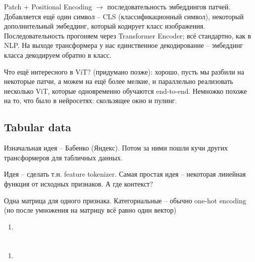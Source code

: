 \documentclass[a4paper,12pt]{article}
\begin{document}
Patch + Positional Encoding $ \to $ последовательность эмбеддингов патчей.
Добавляется ещё один символ -- CLS (классификационный символ), некоторый дополнительный эмбеддинг, который кодирует класс изображения.
Последовательность прогоняем через Transformer Encoder; всё стандартно, как в NLP.
На выходе трансформера у нас единственное декодирование -- эмбеддинг класса декодируем обратно в класс.

Что ещё интересного в ViT? (придумано позже): хорошо, пусть мы разбили на некоторые патчи, а можем на ещё более мелкие, и параллельно реализовать несколько ViT, которые одновременно обучаются end-to-end.
Немножко похоже на то, что было в нейросетях: скользящее окно и пулинг.

\subsection{Tabular data}

Изначальная идея -- Бабенко (Яндекс).
Потом за ними пошли кучи других трансформеров для табличных данных.

Идея -- сделать т.н. feature tokenizer.
Самая простая идея -- некоторая линейная функция от исходных признаков.
А где контекст?

Одна матрица для одного признака.
Категориальные -- обычно one-hot encoding (но после умножения на матрицу всё равно один вектор)

\begin{enumerate}[noitemsep]
	\item 
\end{enumerate}



\section{}
\subsection{}

\begin{enumerate}[noitemsep]
	\item 
\end{enumerate}
	
	
\end{document}
